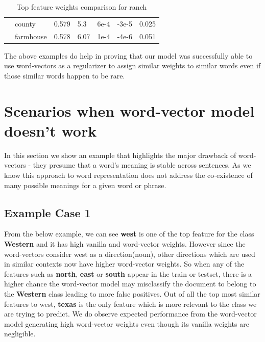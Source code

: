 \begin{table}[htbp]
\begin{tabular}{lllllll}
\multicolumn{1}{l|}{} & \multicolumn{1}{l|}{county} & \multicolumn{1}{l|}{0.579} & \multicolumn{1}{l|}{5.3} & \multicolumn{1}{l|}{6e-4} & \multicolumn{1}{l|}{-3e-5} & 0.025 \\
\multicolumn{1}{l|}{\textbf{}} & \multicolumn{1}{l|}{farmhouse} & \multicolumn{1}{l|}{0.578} & \multicolumn{1}{l|}{6.07} & \multicolumn{1}{l|}{1e-4} & \multicolumn{1}{l|}{-4e-6} & 0.051
\end{tabular}
\caption{\label{tab:widgets}Top feature weights comparison for ranch}
\end{table}


The above examples do help in proving that our model was successfully able to use word-vectors as a regularizer to assign similar weights to similar words even if those similar words happen to be rare.

\newpage
\section{Scenarios when word-vector model doesn't work}

In this section we show an example that highlights the major drawback of word-vectors - they presume that a word's meaning is stable across sentences. As we know this approach to word representation does not address the co-existence of many possible meanings for a given word or phrase.

\subsection{Example Case 1}

From the below example, we can see \textbf{west} is one of the top feature for the class \textbf{Western} and it has high vanilla and word-vector weights. However since the word-vectors consider west as a direction(noun), other directions which are used in similar contexts now have higher word-vector weights. So when any of the features such as \textbf{north}, \textbf{east} or \textbf{south} appear in the train or testset, there is a higher chance the word-vector model may misclassify the document to belong to the \textbf{Western} class leading to more false positives. Out of all the top most similar features to west, \textbf{texas} is the only feature which is more relevant to the class we are trying to predict. We do observe expected performance from the word-vector model generating high word-vector weights even though its vanilla weights are negligible.

